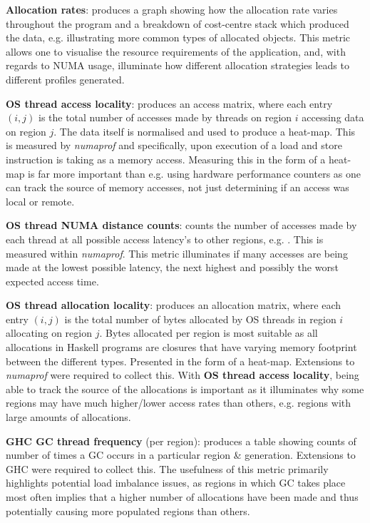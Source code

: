 \documentclass{paper}\usepackage{graphicx}
\begin{document}
\textbf{Allocation rates}: produces a graph showing how the allocation rate varies throughout the program and a breakdown of cost-centre stack which produced the data, e.g. illustrating more common types of allocated objects. This metric allows one to visualise the resource requirements of the application, and, with regards to NUMA usage, illuminate how different allocation strategies leads to different profiles generated.

\textbf{OS thread access locality}: produces an access matrix, where each entry $(i,j)$ is the total number of accesses made by threads on region $i$ accessing data on region $j$. The data itself is normalised and used to produce a heat-map. This is measured by \textit{numaprof} and specifically, upon execution of a load and store instruction is taking as a memory access. Measuring this in the form of a heat-map is far more important than e.g. using hardware performance counters as one can track the source of memory accesses, not just determining if an access was local or remote.
    
\textbf{OS thread NUMA distance counts}: counts the number of accesses made by each thread at all possible access latency's to other regions, e.g. . This is measured within \textit{numaprof}. This metric illuminates if many accesses are being made at the lowest possible latency, the next highest and possibly the worst expected access time.

\textbf{OS thread allocation locality}: produces an allocation matrix, where each entry $(i,j)$ is the total number of bytes allocated by OS threads in region $i$ allocating on region $j$. Bytes allocated per region is most suitable as all allocations in Haskell programs are closures that have varying memory footprint between the different types. Presented in the form of a heat-map. Extensions to \textit{numaprof} were required to collect this. With \textbf{OS thread access locality}, being able to track the source of the allocations is important as it illuminates why some regions may have much higher/lower access rates than others, e.g. regions with large amounts of allocations.

\textbf{GHC GC thread frequency} (per region): produces a table showing counts of number of times a GC occurs in a particular region \& generation. Extensions to GHC were required to collect this. The usefulness of this metric primarily highlights potential load imbalance issues, as regions in which GC takes place most often implies that a higher number of allocations have been made and thus potentially causing more populated regions than others.
    
\end{document}
